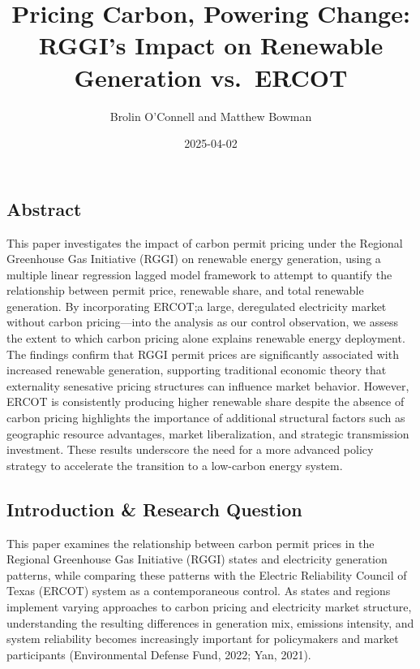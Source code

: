 \documentclass[
]{article}
\title{Pricing Carbon, Powering Change: RGGI's Impact on Renewable
Generation vs.~ERCOT}
\author{Brolin O'Connell and Matthew Bowman}
\date{2025-04-02}
\begin{document}
\maketitle

{
\setcounter{tocdepth}{3}
\tableofcontents
}
\subsection{Abstract}\label{abstract}

This paper investigates the impact of carbon permit pricing under the
Regional Greenhouse Gas Initiative (RGGI) on renewable energy
generation, using a multiple linear regression lagged model framework to
attempt to quantify the relationship between permit price, renewable
share, and total renewable generation. By incorporating ERCOT;a large,
deregulated electricity market without carbon pricing---into the
analysis as our control observation, we assess the extent to which
carbon pricing alone explains renewable energy deployment. The findings
confirm that RGGI permit prices are significantly associated with
increased renewable generation, supporting traditional economic theory
that externality senesative pricing structures can influence market
behavior. However, ERCOT is consistently producing higher renewable
share despite the absence of carbon pricing highlights the importance of
additional structural factors such as geographic resource advantages,
market liberalization, and strategic transmission investment. These
results underscore the need for a more advanced policy strategy to
accelerate the transition to a low-carbon energy system.

\subsection{Introduction \& Research
Question}\label{introduction-research-question}

This paper examines the relationship between carbon permit prices in the
Regional Greenhouse Gas Initiative (RGGI) states and electricity
generation patterns, while comparing these patterns with the Electric
Reliability Council of Texas (ERCOT) system as a contemporaneous
control. As states and regions implement varying approaches to carbon
pricing and electricity market structure, understanding the resulting
differences in generation mix, emissions intensity, and system
reliability becomes increasingly important for policymakers and market
participants (Environmental Defense Fund, 2022; Yan, 2021).
\end{document}
